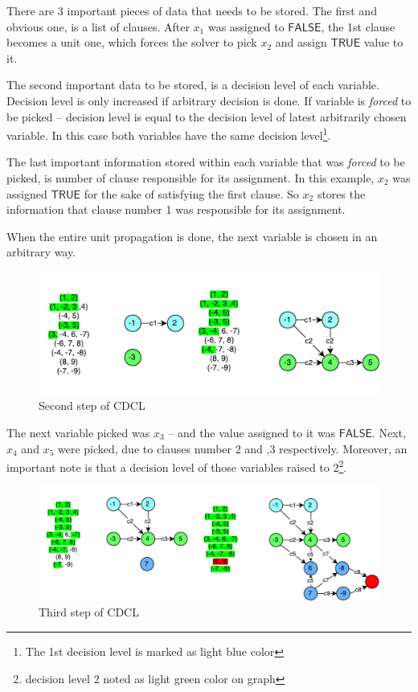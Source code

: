 \documentclass[12pt,english,pdflatex]{aghdpl}
\begin{document}
There are 3 important pieces of data that needs to be stored. The first and obvious one, 
is a list of clauses. After $x_1$ was assigned to $\mathsf{FALSE}$, the 1st
clause becomes a unit one,  which forces the solver to pick $x_2$ and assign $\mathsf{TRUE}$
value to it. 

The second important data to be stored, is a decision
level of each variable. Decision level is only increased if arbitrary
decision is done. If variable is \textit{forced} to be picked -- decision level
is equal to the decision level of latest arbitrarily chosen variable.
In this case both variables have the same decision level\footnote{The 1st decision level is marked as light blue color}. 

The last important information stored within each variable
that was \textit{forced} to be picked, is number of clause responsible for its assignment.
In this example, $x_2$ was assigned $\mathsf{TRUE}$ for the sake of satisfying the first clause.
So $x_2$ stores the information that clause number 1 was responsible
for its assignment.

When the entire unit propagation is done, the next variable is chosen in an arbitrary way.

\begin{figure}[H]
\begin{centering}
\includegraphics[scale=0.8]{img/CDCL_2}
\par\end{centering}
\caption{Second step of CDCL}
\end{figure}

The next variable picked was $x_3$ -- and the value assigned to it was
$\mathsf{FALSE}$. Next,  $x_4$ and $x_5$ were picked, due to clauses number 2 and ,3 respectively.
Moreover, an important note is that a decision level of those variables raised
to 2\footnote{decision level 2 noted as light green color on graph}.

\begin{figure}[H]
\begin{centering}
\includegraphics[scale=0.7]{img/CDCL_3}
\par\end{centering}
\caption{Third step of CDCL}
\end{figure}
\end{document}
